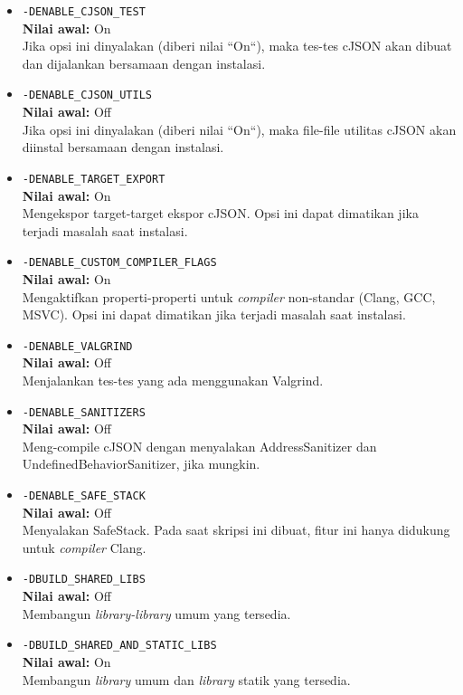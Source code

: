 \documentclass[a4paper,twoside]{article}
\begin{document}
\begin{enumerate}
\begin{itemize}
	\begin{itemize}
		\item \verb|-DENABLE_CJSON_TEST|\\
		\textbf{Nilai awal:} On\\
		Jika opsi ini dinyalakan (diberi nilai ``On``), maka tes-tes cJSON akan dibuat dan dijalankan bersamaan dengan instalasi.
		\item \verb|-DENABLE_CJSON_UTILS|\\
		\textbf{Nilai awal:} Off\\
		Jika opsi ini dinyalakan (diberi nilai ``On``), maka file-file utilitas cJSON akan diinstal  bersamaan dengan instalasi.
		\item \verb|-DENABLE_TARGET_EXPORT|\\
		\textbf{Nilai awal:} On\\
		Mengekspor target-target ekspor cJSON. Opsi ini dapat dimatikan jika terjadi masalah saat instalasi.
		\item \verb|-DENABLE_CUSTOM_COMPILER_FLAGS|\\
		\textbf{Nilai awal:} On\\
		Mengaktifkan properti-properti untuk \textit{compiler} non-standar (Clang, GCC, MSVC). Opsi ini dapat dimatikan jika terjadi masalah saat instalasi.
		\item \verb|-DENABLE_VALGRIND|\\
		\textbf{Nilai awal:} Off\\
		Menjalankan tes-tes yang ada menggunakan \mbox{Valgrind}.
		\item \verb|-DENABLE_SANITIZERS|\\
		\textbf{Nilai awal:} Off\\
		Meng-compile cJSON dengan menyalakan \mbox{AddressSanitizer} dan \mbox{UndefinedBehaviorSanitizer}, jika mungkin.
		\item \verb|-DENABLE_SAFE_STACK|\\
		\textbf{Nilai awal:} Off\\
		Menyalakan SafeStack. Pada saat skripsi ini dibuat, fitur ini hanya didukung untuk \textit{compiler} Clang.
		\item \verb|-DBUILD_SHARED_LIBS|\\
		\textbf{Nilai awal:} Off\\
		Membangun \textit{library-library} umum yang tersedia.
		\item \verb|-DBUILD_SHARED_AND_STATIC_LIBS|\\
		\textbf{Nilai awal:} On\\
		Membangun \textit{library} umum dan \textit{library} statik yang tersedia.

\end{itemize}
\end{itemize}
\end{enumerate}
\end{document}
